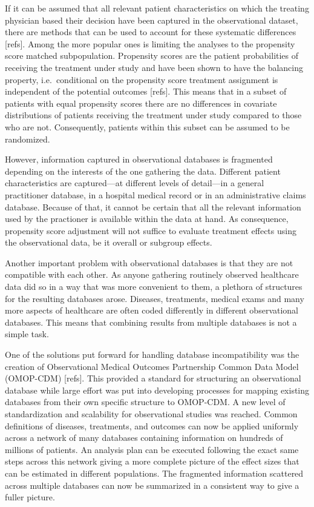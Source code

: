 \documentclass[
]{book}
\begin{document}
If it can be assumed that all relevant patient characteristics on which the
treating physician based their decision have been captured in the observational
dataset, there are methods that can be used to account for these systematic
differences {[}refs{]}. Among the more popular ones is limiting the analyses
to the propensity score matched subpopulation. Propensity scores are the patient
probabilities of receiving the treatment under study and have been shown to have
the balancing property, i.e.~conditional on the propensity score treatment
assignment is independent of the potential outcomes {[}refs{]}. This means that in a
subset of patients with equal propensity scores there are no differences in
covariate distributions of patients receiving the treatment under study compared
to those who are not. Consequently, patients within this subset can be assumed
to be randomized.

However, information captured in observational databases is fragmented depending
on the interests of the one gathering the data. Different patient
characteristics are captured---at different levels of detail---in a general
practitioner database, in a hospital medical record or in an administrative
claims database. Because of that, it cannot be certain that all the relevant
information used by the practioner is available within the data at hand. As
consequence, propensity score adjustment will not suffice to evaluate treatment
effects using the observational data, be it overall or subgroup effects.

Another important problem with observational databases is that they are not
compatible with each other. As anyone gathering routinely observed healthcare
data did so in a way that was more convenient to them, a plethora of structures
for the resulting databases arose. Diseases, treatments, medical exams and many
more aspects of healthcare are often coded differently in different
observational databases. This means that combining results from multiple
databases is not a simple task.

One of the solutions put forward for handling database incompatibility was the
creation of Observational Medical Outcomes Partnership Common Data Model
(OMOP-CDM) {[}refs{]}. This provided a standard for structuring an observational
database while large effort was put into developing processes for mapping
existing databases from their own specific structure to OMOP-CDM. A new level of
standardization and scalability for observational studies was reached. Common
definitions of diseases, treatments, and outcomes can now be applied uniformly
across a network of many databases containing information on hundreds of
millions of patients. An analysis plan can be executed following the exact same
steps across this network giving a more complete picture of the effect sizes
that can be estimated in different populations. The fragmented information
scattered across multiple databases can now be summarized in a consistent way to
give a fuller picture.
\end{document}
